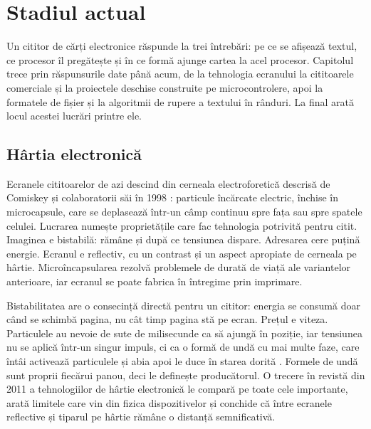 
\chapter{Stadiul actual}
\label{cap:stadiu}

Un cititor de cărți electronice răspunde la trei întrebări: pe ce se afișează
textul, ce procesor îl pregătește și în ce formă ajunge cartea la acel
procesor. Capitolul trece prin răspunsurile date până acum, de la tehnologia
ecranului la cititoarele comerciale și la proiectele deschise construite pe
microcontrolere, apoi la formatele de fișier și la algoritmii de rupere a
textului în rânduri. La final arată locul acestei lucrări printre ele.

\section{Hârtia electronică}
\label{sec:stadiu-epaper}

Ecranele cititoarelor de azi descind din cerneala electroforetică descrisă de
Comiskey și colaboratorii săi în 1998 \citep{comiskey1998}: particule încărcate
electric, închise în microcapsule, care se deplasează într-un câmp continuu
spre fața sau spre spatele celulei. Lucrarea numește proprietățile care fac
tehnologia potrivită pentru citit. Imaginea e bistabilă: rămâne și după ce
tensiunea dispare. Adresarea cere puțină energie. Ecranul e reflectiv, cu un
contrast și un aspect apropiate de cerneala pe hârtie. Microîncapsularea
rezolvă problemele de durată de viață ale variantelor anterioare, iar ecranul
se poate fabrica în întregime prin imprimare.

Bistabilitatea are o consecință directă pentru un cititor: energia se consumă
doar când se schimbă pagina, nu cât timp pagina stă pe ecran. Prețul e viteza.
Particulele au nevoie de sute de milisecunde ca să ajungă în poziție, iar
tensiunea nu se aplică într-un singur impuls, ci ca o formă de undă cu mai
multe faze, care întâi activează particulele și abia apoi le duce în starea
dorită \citep{he2020}. Formele de undă sunt proprii fiecărui panou, deci le
definește producătorul. O trecere în revistă din 2011 a
tehnologiilor de hârtie electronică \citep{heikenfeld2011} le compară pe toate
cele importante, arată limitele care vin din fizica dispozitivelor și
conchide că între ecranele reflective și tiparul pe hârtie rămâne o distanță
semnificativă.

